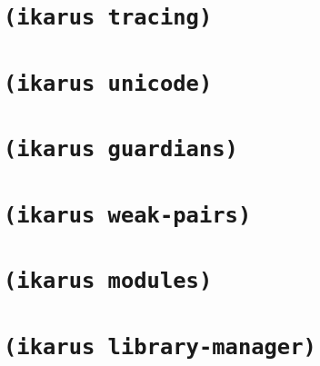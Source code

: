 \documentclass[onecolumn, 12pt, twoside, openright, dvipdfm]{book}
\begin{document}
\section{\texttt{(ikarus tracing)}}
\section{\texttt{(ikarus unicode)}}
\section{\texttt{(ikarus guardians)}}
\cite{dybvig93guardians}
\section{\texttt{(ikarus weak-pairs)}}
\section{\texttt{(ikarus modules)}}
\section{\texttt{(ikarus library-manager)}}

% 


% 
% 
% 
% 

\appendix



\printindex

\backmatter
\end{document}
